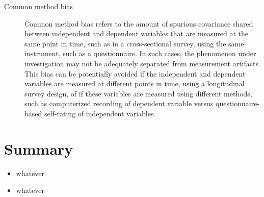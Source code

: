 \begin{description}
\item[Common method bias] Common method bias refers to the amount of spurious covariance shared between independent and dependent variables that are measured at the same point in time, such as in a cross-sectional survey, using the same instrument, such as a questionnaire. In such cases, the phenomenon under investigation may not be adequately separated from measurement artifacts. This bias can be potentially avoided if the independent and dependent variables are measured at different points in time, using a longitudinal survey design, of if these variables are measured using different methods, such as computerized recording of dependent variable versus questionnaire-based self-rating of independent variables.

\end{description}

\section{Summary}

\begin{itemize}
	\item whatever
	\item whatever
\end{itemize}
